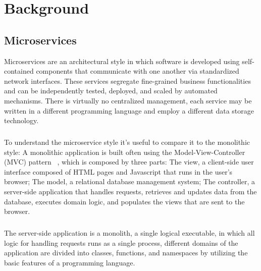 
%

\chapter{Background}
\label{cha:background}

\section{Microservices} %
\label{sec:microservices}

Microservices \cite{microservices, microservices2017tenets, microservicesTomorrow} are an architectural style in which software is developed using self-contained components that
communicate with one another via standardized network interfaces.
These services segregate fine-grained business functionalities and can be independently tested, deployed, and scaled by automated mechanisms.
There is virtually no centralized management, each service may be written in a different programming language and employ a different data storage technology.

\paragraph{}

To understand the microservice style it's useful to compare it to the monolithic style:
A monolithic application is built often using the Model-View-Controller (MVC) pattern ~\cite{mvc}, which is composed by three parts:
The view, a client-side user interface composed of HTML pages and Javascript that runs in the user's browser;
The model, a relational database management system;
The controller, a server-side application that handles requests, retrieves and updates data from the database, executes domain logic,
and populates the views that are sent to the browser.

\paragraph{}

The server-side application is a monolith, a single logical executable, in which all logic for handling requests runs as a single process,
different domains of the application are divided into classes, functions, and namespaces by utilizing the basic features of a programming language.


